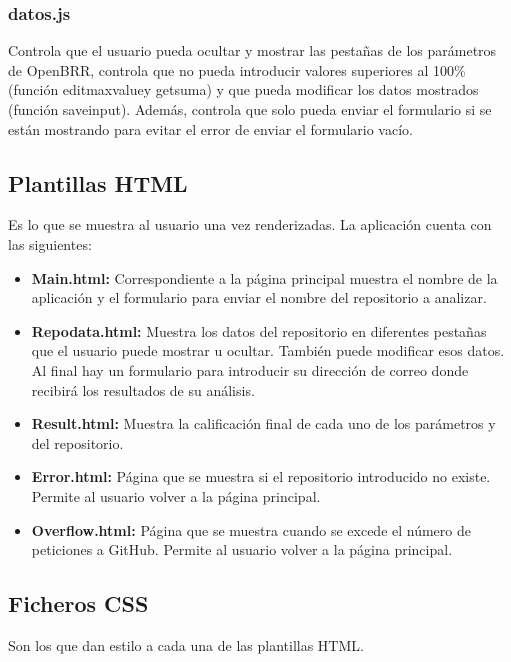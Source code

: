 \documentclass[a4paper, 12pt]{book}
\begin{document}
\subsubsection{datos.js}

Controla que el usuario pueda ocultar y mostrar las pestañas de los parámetros de OpenBRR, controla que no pueda introducir valores superiores al 100\% (función edit\textunderscore max\textunderscore value\textunderscore [parámetro] y get\textunderscore suma) y que pueda modificar los datos mostrados (función save\textunderscore input\textunderscore [parámetro]). Además, controla que solo pueda enviar el formulario si se están mostrando para evitar el error de enviar el formulario vacío.

\subsection{Plantillas HTML}

Es lo que se muestra al usuario una vez renderizadas. La aplicación cuenta con las siguientes:

\begin{itemize}
	\item \textbf{Main.html:} Correspondiente a la página principal muestra el nombre de la aplicación y el formulario para enviar el nombre del repositorio a analizar.
	\item \textbf{Repo\textunderscore data.html:} Muestra los datos del repositorio en diferentes pestañas que el usuario puede mostrar u ocultar. También puede modificar esos datos. Al final hay un formulario para introducir su dirección de correo donde recibirá los resultados de su análisis.
	\item \textbf{Result.html:} Muestra la calificación final de cada uno de los parámetros y del repositorio.
	\item \textbf{Error.html:} Página que se muestra si el repositorio introducido no existe. Permite al usuario volver a la página principal.
	\item \textbf{Overflow.html:} Página que se muestra cuando se excede el número de peticiones a GitHub. Permite al usuario volver a la página principal.
\end{itemize}

\subsection{Ficheros CSS}

Son los que dan estilo a cada una de las plantillas HTML.
\end{document}
